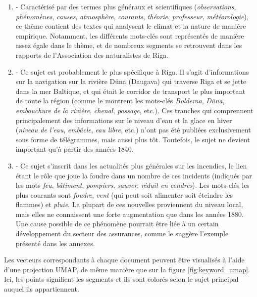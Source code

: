 \documentclass[a4paper,twoside,12pt]{article}
\begin{document}
\begin{enumerate}
    \item \textbf{} - Caractérisé par des termes plus généraux et scientifiques (\textit{observations}, \textit{phénomènes}, \textit{causes}, \textit{atmosphère}, \textit{courants}, \textit{théorie}, \textit{professeur}, \textit{météorologie}), ce thème contient des textes qui analysent le climat et la nature de manière empirique. Notamment, les différents mots-clés sont représentés de manière assez égale dans le thème, et de nombreux segments se retrouvent dans les rapports de l'Association des naturalistes de Riga.

    \item \textbf{} - Ce sujet est probablement le plus spécifique à Riga. Il s'agit d'informations sur la navigation sur la rivière Düna (Daugava) qui traverse Riga et se jette dans la mer Baltique, et qui était le corridor de transport le plus important de toute la région (comme le montrent les mots-clés \textit{Bolderaa}, \textit{Düna}, \textit{embouchure de la rivière}, \textit{chenal}, \textit{passage}, etc.). Ces tranches qui comprennent principalement des informations sur le niveau d'eau et la glace en hiver (\textit{niveau de l'eau}, \textit{embâcle}, \textit{eau libre}, etc.) n'ont pas été publiées exclusivement sous forme de télégrammes, mais aussi plus tôt. Toutefois, le sujet ne devient important qu'à partir des années 1840.

    \item \textbf{} - Ce sujet s'inscrit dans les actualités plus générales sur les incendies, le lien étant le rôle que joue la foudre dans un nombre de ces incidents (indiqués par les mots \textit{feu}, \textit{bâtiment}, \textit{pompiers}, \textit{sauver}, \textit{réduit en cendres}). Les mots-clés les plus courants sont \textit{foudre}, \textit{vent} (qui peut soit alimenter soit éteindre les flammes) et \textit{pluie}. La plupart de ces nouvelles proviennent du niveau local, mais elles ne connaissent une forte augmentation que dans les années 1880. Une cause possible de ce phénomène pourrait être liée à un certain développement du secteur des assurances, comme le suggère l'exemple présenté dans les annexes.
    
\end{enumerate}
\vspace{2ex}

\clearpage


Les vecteurs correspondants à chaque document peuvent être visualisés à l'aide d'une projection UMAP, de même manière que sur la figure \ref{fig:keyword_umap}. Ici, les points signifient les segments et ils sont colorés selon le sujet principal auquel ils appartiennent.
\end{document}
